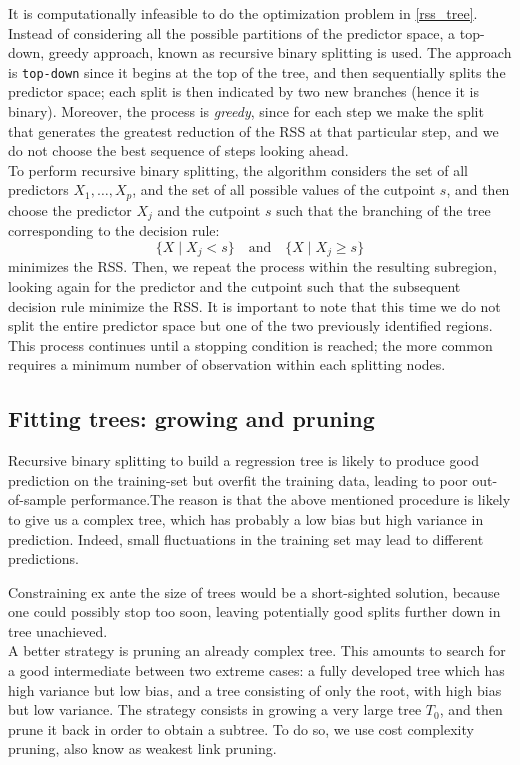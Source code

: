 \documentclass[a4paper,11pt]{article}
\begin{document}
It is computationally infeasible to do the optimization problem in \eqref{rss_tree}. Instead of considering all the possible partitions of the predictor space, a top-down, greedy approach, known as recursive binary splitting is used. The approach is \texttt{top-down} since it begins at the top of the tree, and then sequentially splits the predictor space; each split is then indicated by two new branches (hence it is binary). Moreover, the process is \textit{greedy}, since for each step we make the split that generates the greatest reduction of the RSS at that particular step, and we do not choose the best sequence of steps looking ahead.
\\To perform recursive binary splitting, the algorithm considers the set of all predictors $X_1, \ldots, X_p$, and the set of all possible values of the cutpoint $s$, and then choose the predictor $X_j$ and the cutpoint $s$ such that the branching of the tree corresponding to the decision rule:  $$\{X \mid X_j < s\} \quad \text{and} \quad \{X \mid X_j \geq s\}$$ minimizes the RSS. Then, we repeat the process within the resulting subregion, looking again for the predictor and the cutpoint such that the subsequent decision rule minimize the RSS. It is important to note that this time we do not split the entire predictor space but one of the two previously identified regions. This process continues until a stopping condition is reached; the more common requires a minimum number of observation within each splitting nodes.

\subsection{Fitting trees: growing and pruning}

Recursive binary splitting to build a regression tree  is likely to produce good prediction on the training-set but overfit the training data, leading to poor out-of-sample performance.The reason is that the above mentioned procedure is likely to give us a complex tree, which has probably a low bias but high variance in prediction. Indeed, small fluctuations in the training set may lead to different predictions. 

Constraining ex ante the size of trees would be a short-sighted solution, because one could possibly stop too soon, leaving potentially good splits further down in tree unachieved.
\\A better strategy is pruning an already complex tree. This amounts to search for a good intermediate between two extreme cases: a fully developed tree which has high variance but low bias, and a tree consisting of only the root, with high bias but low variance. 
The strategy consists in growing a very large tree $T_0$, and then prune it back in order to obtain a subtree. To do so, we use cost complexity pruning, also know as weakest link pruning.
\end{document}
